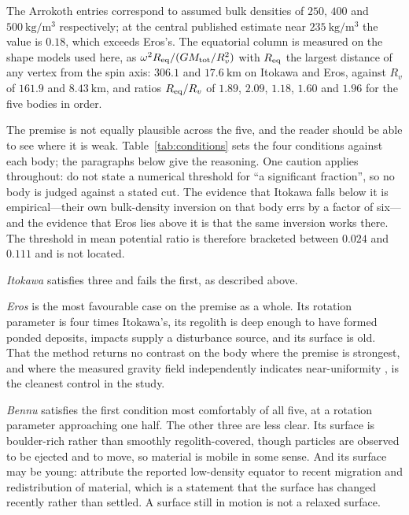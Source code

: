 \begin{table}[htbp]
\vspace{4pt}
\begin{minipage}{\textwidth}
\footnotesize
The Arrokoth entries correspond to assumed bulk densities of $250$, $400$
and $\SI{500}{\kilo\gram\per\cubic\metre}$ respectively; at the central
published estimate near $\SI{235}{\kilo\gram\per\cubic\metre}$ the value is
$0.18$, which exceeds Eros's. The equatorial column is measured on the shape models used here, as
$\omega^{2}R_{\rm eq}/(GM_{\mathrm{tot}}/R_{v}^{2})$ with $R_{\rm eq}$ the largest
distance of any vertex from the spin axis: $306.1$ and $\SI{17.6}{\kilo\metre}$
on Itokawa and Eros, against $R_{v}$ of $161.9$ and
$\SI{8.43}{\kilo\metre}$, and ratios $R_{\rm eq}/R_{v}$ of $1.89$, $2.09$,
$1.18$, $1.60$ and $1.96$ for the five bodies in order.
\end{minipage}
\end{table}

The premise is not equally plausible across the five, and the reader should
be able to see where it is weak. Table~\ref{tab:conditions} sets the four
conditions against each body; the paragraphs below give the reasoning. One
caution applies throughout: \citet{richardson2014} do not state a numerical
threshold for ``a significant fraction'', so no body is judged against a
stated cut. The evidence that Itokawa falls below it is empirical---their own
bulk-density inversion on that body errs by a factor of six---and the
evidence that Eros lies above it is that the same inversion works there. The
threshold in mean potential ratio is therefore bracketed between $0.024$ and
$0.111$ and is not located.

\emph{Itokawa} satisfies three and fails the first, as described above.

\emph{Eros} is the most favourable case on the premise as a whole. Its
rotation parameter is four times Itokawa's, its regolith is deep enough to
have formed ponded deposits, impacts supply a disturbance source, and its
surface is old. That the method returns no contrast on the body where the
premise is strongest, and where the measured gravity field independently
indicates near-uniformity \citep{yeomans2000}, is the cleanest control in
the study.

\emph{Bennu} satisfies the first condition most comfortably of all five, at
a rotation parameter approaching one half. The other three are less clear.
Its surface is boulder-rich rather than smoothly regolith-covered, though
particles are observed to be ejected and to move, so material is mobile in
some sense. And its surface may be young: \citet{scheeres2020} attribute the
reported low-density equator to recent migration and redistribution of
material, which is a statement that the surface has changed recently rather
than settled. A surface still in motion is not a relaxed surface.

